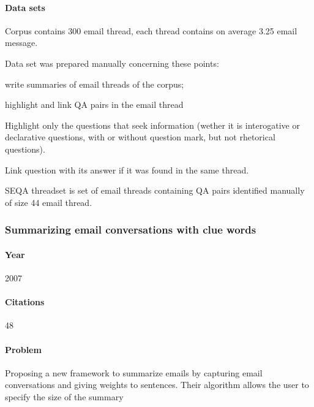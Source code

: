 \documentclass[12pt]{article}
\newenvironment{my_itemize}
{\begin{itemize}
  \setlength{\itemsep}{0cm}
  \setlength{\parskip}{0cm}}
{\end{itemize}}
\begin{document}
\paragraph{Data sets}
\begin{my_itemize}
  \item Corpus contains 300 email thread, each thread contains on average 3.25 email message.
  \item Data set was prepared manually concerning these points:
  \begin{my_itemize}
    \item write summaries of email threads of the corpus;
    \item highlight and link QA pairs in the email thread
    \begin{my_itemize}
      \item Highlight only the questions that seek information (wether it is 
	    interogative or declarative questions, with or without question mark, 
	    but not rhetorical questions).
      \item Link question with its answer if it was found in the same thread.
    \end{my_itemize}
  \end{my_itemize}
  \item SEQA threadset is set of email threads containing QA pairs identified manually of size 44 email thread.
\end{my_itemize}



\subsubsection{Summarizing email conversations with clue words \cite{GIUSEPPE07}}

\paragraph{Year} 2007
\paragraph{Citations} 48

\paragraph{Problem} 
Proposing a new framework to summarize emails by capturing email conversations 
and giving weights to sentences. Their algorithm allows the user to specify the size of the summary
\end{document}
